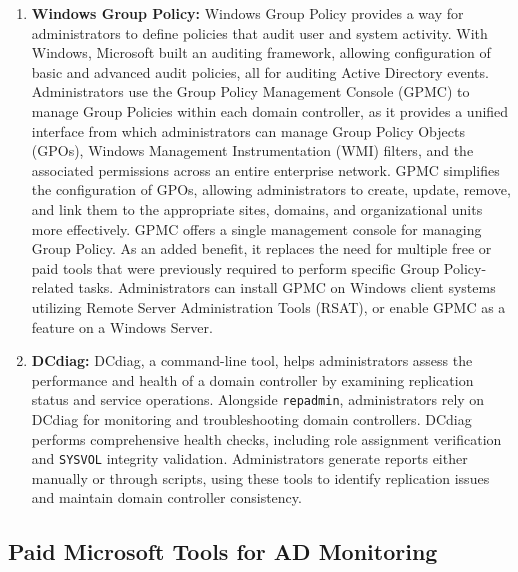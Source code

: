 \begin{enumerate}
    \item \textbf{Windows Group Policy:} Windows Group Policy provides a way for administrators to define policies that audit user and system activity. With Windows, Microsoft built an auditing framework, allowing configuration of basic and advanced audit policies, all for auditing Active Directory events. Administrators use the Group Policy Management Console (GPMC) to manage Group Policies within each domain controller, as it provides a unified interface from which administrators can manage Group Policy Objects (GPOs), Windows Management Instrumentation (WMI) filters, and the associated permissions across an entire enterprise network. GPMC simplifies the configuration of GPOs, allowing administrators to create, update, remove, and link them to the appropriate sites, domains, and organizational units more effectively. GPMC offers a single management console for managing Group Policy. As an added benefit, it replaces the need for multiple free or paid tools that were previously required to perform specific Group Policy-related tasks. Administrators can install GPMC on Windows client systems utilizing Remote Server Administration Tools (RSAT), or enable GPMC as a feature on a Windows Server.
    \item \textbf{DCdiag:} DCdiag, a command-line tool, helps administrators assess the performance and health of a domain controller by examining replication status and service operations. Alongside \texttt{repadmin}, administrators rely on DCdiag for monitoring and troubleshooting domain controllers. DCdiag performs comprehensive health checks, including role assignment verification and \texttt{SYSVOL} integrity validation. Administrators generate reports either manually or through scripts, using these tools to identify replication issues and maintain domain controller consistency.
\end{enumerate}

\subsection{\textbf{Paid Microsoft Tools for AD Monitoring}}

